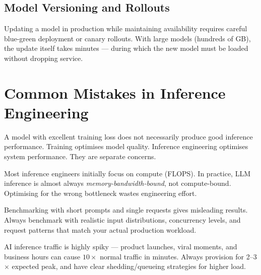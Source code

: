 \documentclass[12pt, twoside, openright]{book}
\begin{document}
\subsection{Model Versioning and Rollouts}

Updating a model in production while maintaining availability requires
careful blue-green deployment or canary rollouts.
With large models (hundreds of GB), the update itself takes minutes ---
during which the new model must be loaded without dropping service.

\section{Common Mistakes in Inference Engineering}

\begin{warningbox}
A model with excellent training loss does not necessarily produce
good inference performance. Training optimises model quality.
Inference engineering optimises system performance.
They are separate concerns.
\end{warningbox}

\begin{warningbox}
Most inference engineers initially focus on compute (FLOPS).
In practice, LLM inference is almost always
\textit{memory-bandwidth-bound}, not compute-bound.
Optimising for the wrong bottleneck wastes engineering effort.
\end{warningbox}

\begin{warningbox}
Benchmarking with short prompts and single requests gives misleading
results. Always benchmark with realistic input distributions,
concurrency levels, and request patterns that match your actual
production workload.
\end{warningbox}

\begin{warningbox}
AI inference traffic is highly spiky --- product launches, viral
moments, and business hours can cause $10\times$ normal traffic in
minutes. Always provision for 2--3$\times$ expected peak, and have
clear shedding/queueing strategies for higher load.
\end{warningbox}
\end{document}
